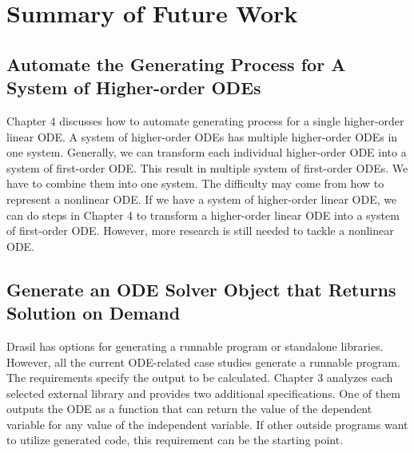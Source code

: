 \chapter{Summary of Future Work}

\section{Automate the Generating Process for A System of Higher-order ODEs}
Chapter 4 discusses how to automate generating process for a single higher-order linear ODE. A system of higher-order ODEs has multiple higher-order ODEs in one system. Generally, we can transform each individual higher-order ODE into a system of first-order ODE. This result in multiple system of first-order ODEs. We have to combine them into one system. The difficulty may come from how to represent a nonlinear ODE. If we have a system of higher-order linear ODE, we can do steps in Chapter 4 to transform a higher-order linear ODE into a system of first-order ODE. However, more research is still needed to tackle a nonlinear ODE.

\section{Generate an ODE Solver Object that Returns Solution on Demand}
Drasil has options for generating a runnable program or standalone libraries. However, all the current ODE-related case studies generate a runnable program. The requirements specify the output to be calculated. Chapter 3 analyzes each selected external library and provides two additional specifications. One of them outputs the ODE as a function that can return the value of the dependent variable for any value of the independent variable. If other outside programs want to utilize generated code, this requirement can be the starting point.




